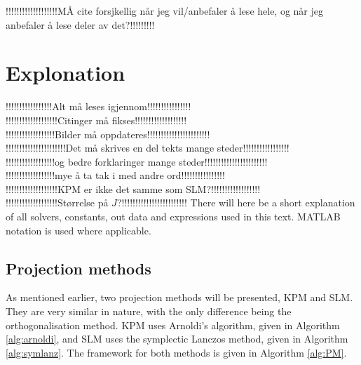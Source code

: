 !!!!!!!!!!!!!!!!!!!MÅ cite forsjkellig når jeg vil/anbefaler å lese hele, og når jeg anbefaler å lese deler av det?!!!!!!!!!\\
\chapter{Explonation}
!!!!!!!!!!!!!!!!!Alt må leses igjennom!!!!!!!!!!!!!!!!\\
!!!!!!!!!!!!!!!!!!!Citinger må fikses!!!!!!!!!!!!!!!!!!!\\
!!!!!!!!!!!!!!!!!!Bilder må oppdateres!!!!!!!!!!!!!!!!!!!!!!!\\
!!!!!!!!!!!!!!!!!!!!!!Det må skrives en del tekts mange steder!!!!!!!!!!!!!!!!!\\
!!!!!!!!!!!!!!!!!!og bedre forklaringer mange steder!!!!!!!!!!!!!!!!!!!!!!!\\
!!!!!!!!!!!!!!!!!!mye å ta tak i med andre ord!!!!!!!!!!!!!!!!\\
!!!!!!!!!!!!!!!!!!!KPM er ikke det samme som SLM?!!!!!!!!!!!!!!!!!!\\
!!!!!!!!!!!!!!!!!!!Størrelse på $J$?!!!!!!!!!!!!!!!!!!!!!!!!
There will here be a short explanation of all solvers, constants, out data and expressions used in this text. MATLAB notation is used where applicable.%

\section{Projection methods}
As mentioned earlier, two projection methods will be presented, KPM and SLM. They are very similar in nature, with the only difference being the orthogonalisation method. KPM uses Arnoldi's algorithm, given in Algorithm \ref{alg:arnoldi}, and SLM uses the symplectic Lanczos method, given in Algorithm \ref{alg:symlanz}. The framework for both methods is given in Algorithm \ref{alg:PM}. \\

